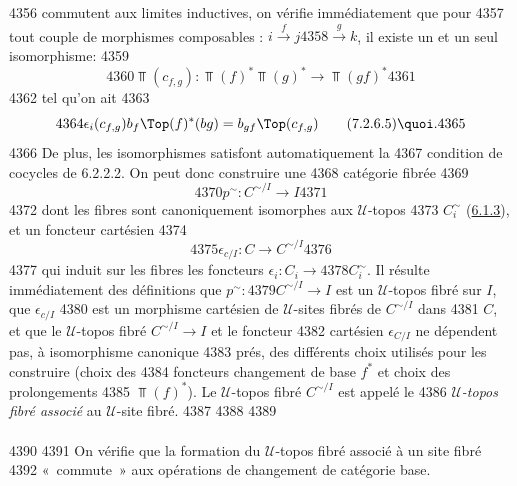   4356	commutent aux limites inductives, on vérifie immédiatement que pour
  4357	tout couple de morphismes composables : $i \xrightarrow{f} j
  4358	\xrightarrow{g} k$, il existe un et un seul isomorphisme:
  4359	\begin{equation*}
  4360	\Top(c_{f, g}) : \Top(f)^{\ast} \Top(g)^{\ast} \to \Top(gf)^{\ast}\tag{7.2.6.4}
  4361	\end{equation*}
  4362	tel qu'on ait
  4363	\begin{equation*}
  4364	\epsilon_i (c_{f, g})b_f \Top(f)^{\ast}(bg) = b_{gf} \Top(c_{f,g})\tag{7.2.6.5}{\quoi}.
  4365	\end{equation*}
  4366	De plus, les isomorphismes  satisfont automatiquement la
  4367	condition de cocycles de 6.2.2.2. On peut donc construire une
  4368	catégorie fibrée
  4369	\begin{equation*}
  4370	p^{\sim} : C^{\sim / I} \to I\tag{7.2.6.6}
  4371	\end{equation*}
  4372	dont les fibres sont canoniquement isomorphes aux $𝒰$-topos
  4373	$C^{\sim}_i$ (\hyperref[VI.subsubsec6.1.3]{6.1.3}), et un foncteur cartésien
  4374	\begin{equation*}
  4375	\epsilon_{c/I} : C \to C^{\sim /I}\tag{7.2.6.7}
  4376	\end{equation*}
  4377	qui induit sur les fibres les foncteurs $\epsilon_i : C_{i} \to
  4378	C^{\sim}_i$. Il résulte immédiatement des définitions que $p^{\sim} :
  4379	C^{\sim/I} \to I$ est un $𝒰$-topos fibré sur $I$, que $\epsilon_{c/I}$
  4380	est un morphisme cartésien de $𝒰$-sites fibrés de $C^{\sim/I}$ dans
  4381	$C$, et que le $𝒰$-topos fibré $C^{\sim /I} \to I$ et le foncteur
  4382	cartésien $\epsilon_{C/I}$ ne dépendent pas, à isomorphisme canonique
  4383	prés, des différents choix utilisés pour les construire (choix des
  4384	foncteurs changement de base $f^{\ast}$ et choix des prolongements
  4385	$\Top(f)^{\ast}$). Le $𝒰$-topos fibré $C^{\sim/I}$ est appelé le
  4386	\emph{$𝒰$-topos fibré associé} au $𝒰$-site fibré.
  4387	
  4388	\setcounter{paragraph}{7}
  4389	\paragraph{}
  4390	
  4391	On vérifie que la formation du $𝒰$-topos fibré associé à un site fibré
  4392	« commute » aux opérations de changement de catégorie base.
